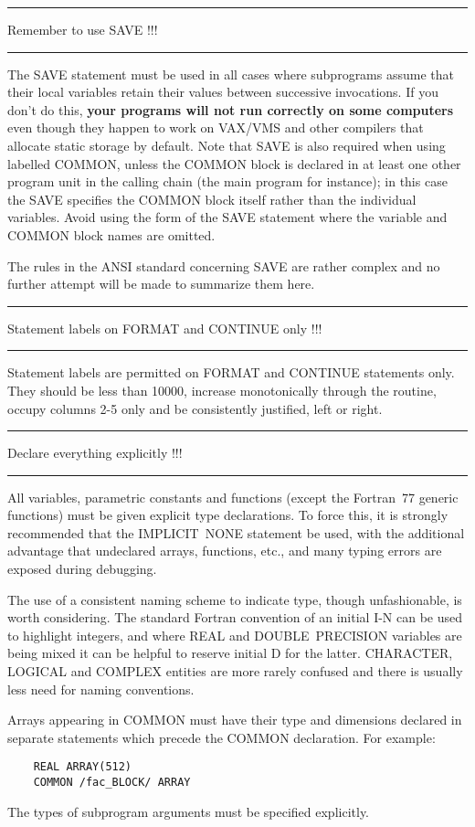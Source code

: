 \documentclass[twoside,11pt]{article}
\newcounter{sruleno}
\newcommand{\srule}[1]{
    \addtocounter{sruleno}{1}
    \goodbreak
    \rule[0.5ex]{\textwidth}{0.3mm}
    {\Large #1 \hfill {\thesruleno}}
    \rule[0.5ex]{\textwidth}{0.1mm}
}
\newcommand{\srule}[1]{
       \addtocounter{sruleno}{1}
       \begin{rawhtml} <HR> \end{rawhtml}
       {\Large \thesruleno}~~~~{\Large #1}
       \begin{rawhtml} <HR> \end{rawhtml}
       \end{tabular}
  }
\renewcommand{\_}{{\tt\char'137}}
\begin{document}
\srule{Remember to use SAVE !!!}
The SAVE statement must be used in all cases where
subprograms assume that their local variables retain
their values between successive invocations.  If you
don't do this, {\bf your programs will not run
correctly on some computers} even though they happen to work on VAX/VMS
and other compilers that allocate static storage by default.
Note that SAVE is
also required when using labelled COMMON, unless the COMMON block is
declared in at least one other program unit in the calling chain
(the main program for instance); in this case the SAVE specifies the
COMMON block itself rather than the
individual variables.  Avoid using the form of the SAVE statement
where the variable and COMMON block names are omitted.

The rules in the ANSI standard concerning SAVE are rather complex and
no further attempt will be made to summarize them here.

\srule{Statement labels on FORMAT and CONTINUE only !!!}
Statement labels are permitted on FORMAT and CONTINUE statements only.
They should be less than 10000, increase monotonically through the routine,
occupy columns 2-5 only and be consistently justified, left or right.

\srule{Declare everything explicitly !!!}
All variables, parametric constants and functions (except the Fortran~77
generic functions) must be given explicit type declarations.
To force this, it is strongly recommended that the IMPLICIT~NONE statement be
used, with the additional advantage
that undeclared arrays, functions, etc., and
many typing errors are exposed during debugging.

The use of a consistent naming scheme to indicate type, though
unfashionable, is worth considering.
The standard Fortran convention of
an initial I-N can be used to highlight integers, and where REAL and
DOUBLE~PRECISION variables are being mixed it can be helpful to
reserve initial D for the latter.  CHARACTER, LOGICAL and
COMPLEX entities are more rarely confused and there is
usually less need for naming conventions.

Arrays appearing in COMMON must have their type and dimensions declared in
separate statements which precede the COMMON declaration.
For example:
\begin{verbatim}
    REAL ARRAY(512)
    COMMON /fac_BLOCK/ ARRAY
\end{verbatim}

The types of subprogram arguments must be specified explicitly.
\end{document}
